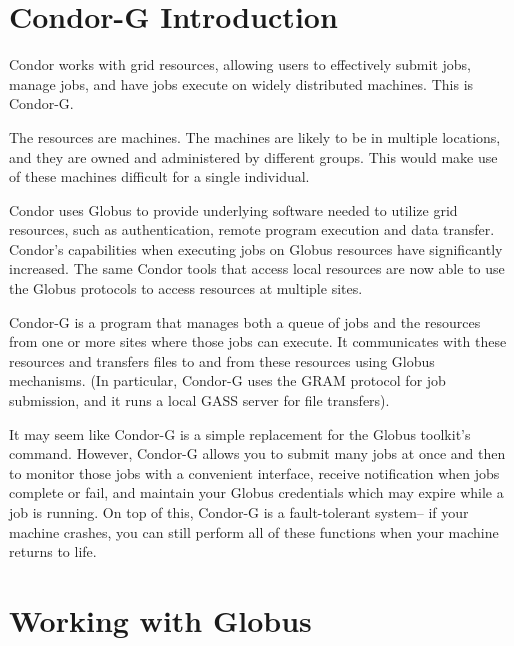 \section{\label{sec:Condor-G-Intro}Condor-G Introduction}

Condor works with grid resources, allowing users to
effectively submit jobs, manage jobs, and have jobs execute
on widely distributed machines.
This is Condor-G.

The resources are machines.
The machines are likely to be in multiple locations, and
they are owned and administered by different groups. 
This would make use of these machines difficult for a
single individual.

Condor uses 
Globus to provide underlying software needed to utilize
grid resources, such as authentication, remote program
execution and data transfer.
Condor's capabilities when executing jobs on Globus resources have
significantly increased.
The same Condor tools that access local resources 
are now able to use the Globus protocols to access resources at multiple
sites. 

Condor-G is a program that manages both a queue of jobs
and the resources from one or more sites where those jobs can execute. 
It communicates with these resources and transfers files
to and from these resources using Globus mechanisms.
(In particular, Condor-G uses the GRAM protocol for job submission,
and it runs a local GASS server for file transfers).

It may seem like Condor-G is a simple replacement
for the Globus toolkit's  command.
However, Condor-G allows you to submit many jobs at once
and then to monitor those jobs with a convenient interface,
receive notification when jobs complete or fail,
and maintain your Globus credentials
which may expire while a job is running.
On top of this, Condor-G is a fault-tolerant system--
if your machine crashes,
you can still perform all of these functions when your machine returns to life.

\section{\label{sec:Globus-intro}Working with Globus}

